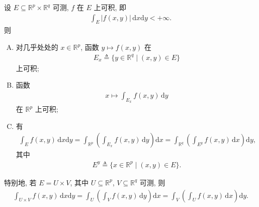 \documentclass[../../main.tex]{subfiles}%
\begin{document}
\begin{theorem}[Fubini定理]\label{theorem:实变函数-Fubini定理}
设 \(E\subseteq\mathbb{R}^p\times\mathbb{R}^q\) 可测, \(f\) 在 \(E\) 上可积, 即
\begin{align*}
\int_E |f(x,y)|\,\mathrm{d}x\mathrm{d}y<+\infty.
\end{align*}
则
\begin{enumerate}[(A)]
\item 对几乎处处的 \(x\in\mathbb{R}^p\), 函数 \(y\mapsto f(x,y)\) 在
\begin{align*}
E_x\triangleq\{y\in\mathbb{R}^q\mid (x,y)\in E\}
\end{align*}
上可积;
\item 函数
\begin{align*}
x\mapsto\int_{E_x} f(x,y)\,\mathrm{d}y
\end{align*}
在 \(\mathbb{R}^p\) 上可积;
\item 有
\begin{align*}
\int_E f(x,y)\,\mathrm{d}x\mathrm{d}y
=\int_{\mathbb{R}^p}\left(\int_{E_x} f(x,y)\,\mathrm{d}y\right)\mathrm{d}x=\int_{\mathbb{R}^q}\left(\int_{E^y} f(x,y)\,\mathrm{d}x\right)\mathrm{d}y,
\end{align*}
其中
\begin{align*}
E^y\triangleq\{x\in\mathbb{R}^p\mid (x,y)\in E\}.
\end{align*}
\end{enumerate}
特别地, 若 \(E=U\times V\), 其中 \(U\subseteq\mathbb{R}^p\), \(V\subseteq\mathbb{R}^q\) 可测, 则
\begin{align*}
\int_{U\times V} f(x,y)\,\mathrm{d}x\mathrm{d}y
=\int_U\left(\int_V f(x,y)\,\mathrm{d}y\right)\mathrm{d}x=\int_V\left(\int_U f(x,y)\,\mathrm{d}x\right)\mathrm{d}y.
\end{align*}
\end{theorem}
\end{document}
